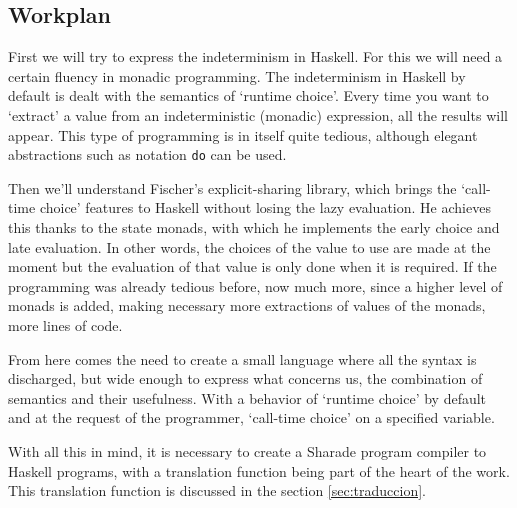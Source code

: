 \documentclass[class=article, crop=false]{standalone}
\begin{document}
\subsection{Workplan}
First we will try to express the indeterminism in Haskell. For this we will need a certain
fluency in monadic programming.  The indeterminism in Haskell by default is dealt with the
semantics of `runtime choice'. Every time you want to `extract' a value from an
indeterministic (monadic) expression, all the results will appear. This type of programming
is in itself quite tedious, although elegant abstractions such as notation \verb`do` can be
used.

Then we'll understand Fischer's explicit-sharing library, which brings the `call-time choice'
features to Haskell without losing the lazy evaluation. He achieves this thanks to the state
monads, with which he implements the early choice and late evaluation. In other words, the
choices of the value to use are made at the moment but the evaluation of that value is only
done when it is required. If the programming was already tedious before, now much more, since
a higher level of monads is added, making necessary more extractions of values of the monads,
more lines of code.

From here comes the need to create a small language where all the syntax is discharged, but
wide enough to express what concerns us, the combination of semantics and their usefulness.
With a behavior of `runtime choice' by default and at the request of the programmer,
`call-time choice' on a specified variable.

With all this in mind, it is necessary to create a Sharade program compiler to Haskell
programs, with a translation function being part of the heart of the work. This translation
function is discussed in the section \ref{sec:traduccion}.
\end{document}
